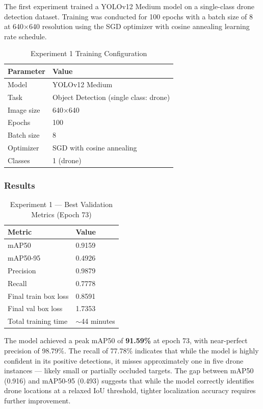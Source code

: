 \documentclass[12pt,a4paper]{report}
\begin{document}
The first experiment trained a YOLOv12 Medium model on a single-class drone
detection dataset. Training was conducted for 100 epochs with a batch size of 8
at 640$\times$640 resolution using the SGD optimizer with cosine annealing
learning rate schedule.

\begin{table}[H]
\centering
\caption{Experiment 1 Training Configuration}
\begin{tabular}{@{}ll@{}}
\toprule
\textbf{Parameter} & \textbf{Value} \\
\midrule
Model & YOLOv12 Medium \\
Task & Object Detection (single class: drone) \\
Image size & 640$\times$640 \\
Epochs & 100 \\
Batch size & 8 \\
Optimizer & SGD with cosine annealing \\
Classes & 1 (drone) \\
\bottomrule
\end{tabular}
\end{table}

\subsubsection{Results}

\begin{table}[H]
\centering
\caption{Experiment 1 — Best Validation Metrics (Epoch 73)}
\begin{tabular}{@{}ll@{}}
\toprule
\textbf{Metric} & \textbf{Value} \\
\midrule
mAP50 & 0.9159 \\
mAP50-95 & 0.4926 \\
Precision & 0.9879 \\
Recall & 0.7778 \\
Final train box loss & 0.8591 \\
Final val box loss & 1.7353 \\
Total training time & $\sim$44 minutes \\
\bottomrule
\end{tabular}
\end{table}

The model achieved a peak mAP50 of \textbf{91.59\%} at epoch 73, with near-perfect
precision of 98.79\%. The recall of 77.78\% indicates that while the model is
highly confident in its positive detections, it misses approximately one in five
drone instances — likely small or partially occluded targets. The gap between
mAP50 (0.916) and mAP50-95 (0.493) suggests that while the model correctly
identifies drone locations at a relaxed IoU threshold, tighter localization
accuracy requires further improvement.
\end{document}
